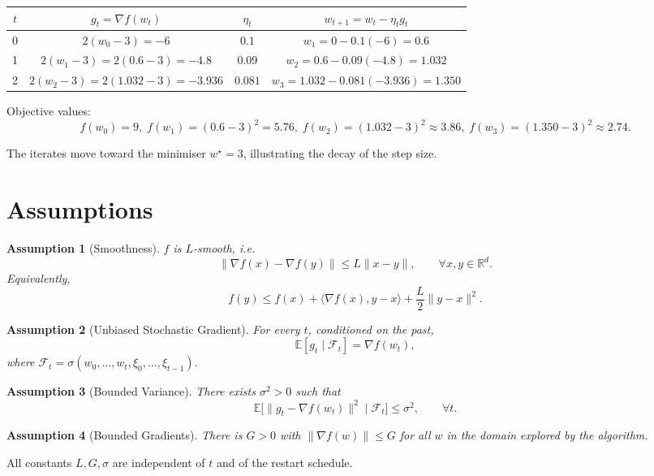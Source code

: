 \documentclass[11pt]{article}
\newtheorem{assumption}{Assumption}
\newcommand{\E}{\mathbb{E}}
\newcommand{\R}{\mathbb{R}}
\begin{document}
\begin{tabular}{c|c|c|c}
$t$ & $g_t=\nabla f(w_t)$ & $\eta_t$ & $w_{t+1}=w_t-\eta_t g_t$ \\ \hline
0 & $2(w_0-3)=-6$ & $0.1$ & $w_1=0-0.1(-6)=0.6$ \\ 
1 & $2(w_1-3)=2(0.6-3)=-4.8$ & $0.09$ & $w_2=0.6-0.09(-4.8)=1.032$ \\ 
2 & $2(w_2-3)=2(1.032-3)=-3.936$ & $0.081$ & $w_3=1.032-0.081(-3.936)=1.350$ 
\end{tabular}

Objective values:
\[
f(w_0)=9,\; f(w_1)=(0.6-3)^2=5.76,\; f(w_2)=(1.032-3)^2\approx3.86,\; f(w_3)=(1.350-3)^2\approx2.74.
\]

The iterates move toward the minimiser $w^\star=3$, illustrating the decay of the step size.

\newpage
\section*{Assumptions}
\begin{assumption}[Smoothness]\label{ass:smooth}
$f$ is $L$‑smooth, i.e.
\[
\|\nabla f(x)-\nabla f(y)\|\le L\|x-y\|,\qquad\forall x,y\in\R^{d}.
\]
Equivalently,
\[
f(y)\le f(x)+\langle\nabla f(x),y-x\rangle+\frac{L}{2}\|y-x\|^{2}.
\]
\end{assumption}

\begin{assumption}[Unbiased Stochastic Gradient]\label{ass:unbiased}
For every $t$, conditioned on the past,
\[
\E[g_t\mid\mathcal{F}_t]=\nabla f(w_t),
\]
where $\mathcal{F}_t=\sigma(w_0,\dots,w_t,\xi_0,\dots,\xi_{t-1})$.
\end{assumption}

\begin{assumption}[Bounded Variance]\label{ass:var}
There exists $\sigma^{2}>0$ such that
\[
\E\big[\|g_t-\nabla f(w_t)\|^{2}\mid\mathcal{F}_t\big]\le\sigma^{2},\qquad\forall t.
\]
\end{assumption}

\begin{assumption}[Bounded Gradients]\label{ass:gradbound}
There is $G>0$ with $\|\nabla f(w)\|\le G$ for all $w$ in the domain explored by the algorithm.
\end{assumption}

All constants $L,G,\sigma$ are independent of $t$ and of the restart schedule.
\end{document}
